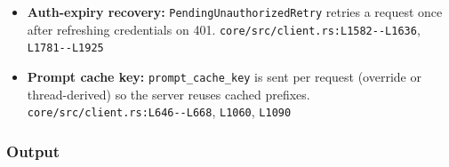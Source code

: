 \begin{itemize}
\item \textbf{Auth-expiry recovery:} \texttt{PendingUnauthorizedRetry} retries a request once after refreshing credentials on 401. \texttt{core/\allowbreak{}src/\allowbreak{}client.\allowbreak{}rs:\allowbreak{}L1582-\allowbreak{}-\allowbreak{}L1636}, \texttt{L1781-\allowbreak{}-\allowbreak{}L1925}
\item \textbf{Prompt cache key:} \texttt{prompt\_\allowbreak{}cache\_\allowbreak{}key} is sent per request (override or thread-derived) so the server reuses cached prefixes. \texttt{core/\allowbreak{}src/\allowbreak{}client.\allowbreak{}rs:\allowbreak{}L646-\allowbreak{}-\allowbreak{}L668}, \texttt{L1060}, \texttt{L1090}
\end{itemize}

\subsubsection*{Output}
